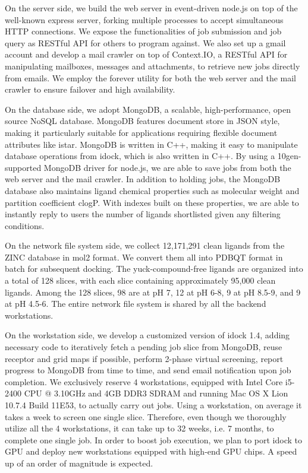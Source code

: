 On the server side, we build the web server in event-driven node.js on top of the well-known express server, forking multiple processes to accept simultaneous HTTP connections. We expose the functionalities of job submission and job query as RESTful API for others to program against. We also set up a gmail account and develop a mail crawler on top of Context.IO, a RESTful API for manipulating mailboxes, messages and attachments, to retrieve new jobs directly from emails. We employ the forever utility for both the web server and the mail crawler to ensure failover and high availability.

On the database side, we adopt MongoDB, a scalable, high-performance, open source NoSQL database. MongoDB features document store in JSON style, making it particularly suitable for applications requiring flexible document attributes like istar. MongoDB is written in C++, making it easy to manipulate database operations from idock, which is also written in C++. By using a 10gen-supported MongoDB driver for node.js, we are able to save jobs from both the web server and the mail crawler. In addition to holding jobs, the MongoDB database also maintains ligand chemical properties such as molecular weight and partition coefficient clogP. With indexes built on these properties, we are able to instantly reply to users the number of ligands shortlisted given any filtering conditions.

On the network file system side, we collect 12,171,291 clean ligands from the ZINC database \citep{532} in mol2 format. We convert them all into PDBQT format in batch for subsequent docking. The yuck-compound-free ligands are organized into a total of 128 slices, with each slice containing approximately 95,000 clean ligands. Among the 128 slices, 98 are at pH 7, 12 at pH 6-8, 9 at pH 8.5-9, and 9 at pH 4.5-6. The entire network file system is shared by all the backend workstations.

On the workstation side, we develop a customized version of idock 1.4, adding necessary code to iteratively fetch a pending job slice from MongoDB, reuse receptor and grid maps if possible, perform 2-phase virtual screening, report progress to MongoDB from time to time, and send email notification upon job completion. We exclusively reserve 4 workstations, equipped with Intel Core i5-2400 CPU @ 3.10GHz and 4GB DDR3 SDRAM and running Mac OS X Lion 10.7.4 Build 11E53, to actually carry out jobs. Using a workstation, on average it takes a week to screen one single slice. Therefore, even though we thoroughly utilize all the 4 workstations, it can take up to 32 weeks, i.e. 7 months, to complete one single job. In order to boost job execution, we plan to port idock to GPU and deploy new workstations equipped with high-end GPU chips. A speed up of an order of magnitude is expected.

